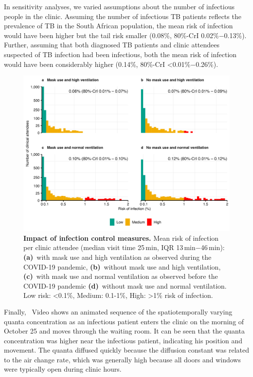 \documentclass[fleqn,11pt]{wlscirep}
\begin{document}
In sensitivity analyses, we varied assumptions about the number of infectious people in the clinic. Assuming the number of infectious TB patients reflects the prevalence of TB in the South African population, the mean risk of infection would have been higher but the tail risk smaller (0.08\%, 80\%-CrI 0.02\%$-$0.13\%). Further, assuming that both diagnosed TB patients and clinic attendees suspected of TB infection had been infectious, both the mean risk of infection would have been considerably higher (0.14\%, 80\%-CrI <0.01\%$-$0.26\%).  

\begin{figure}
    \centering
    \includegraphics{results/modeling/mean-roi-comparison.png}
    \caption{\textbf{Impact of infection control measures.} Mean risk of infection per clinic attendee (median visit time 25\,min, IQR 13\,min$-$46\,min): \textbf{(a)}~with mask use and high ventilation as observed during the COVID-19 pandemic, \textbf{(b)}~without mask use and high ventilation, \textbf{(c)}~with mask use and normal ventilation as observed before the COVID-19 pandemic  \textbf{(d)}~without mask use and normal ventilation. Low risk: <0.1\%, Medium: 0.1-1\%, High: >1\% risk of infection.}
    \label{fig:scenario-results}
\end{figure}

Finally, \supp~Video shows an animated sequence of the spatiotemporally varying quanta concentration as an infectious patient enters the clinic on the morning of October 25 and moves through the waiting room. It can be seen that the quanta concentration was higher near the infectious patient, indicating his position and movement. The quanta diffused quickly because the diffusion constant was related to the air change rate, which was generally high because all doors and windows were typically open during clinic hours.
\end{document}

